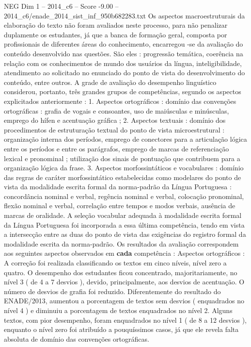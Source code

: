 \begin{textsample}{NEG Dim 1 – 2014\_c6 – Score -9.00 – 2014\_c6/enade\_2014\_sist\_inf\_950b682283.txt}
Os aspectos macroestruturais da elaboração do texto não foram avaliados neste processo, para não penalizar duplamente os estudantes, já que a banca de formação geral, composta por profissionais de diferentes áreas do conhecimento, encarregou -se da avaliação do conteúdo desenvolvido nas questões.
São eles : progressão temática, coerência na relação com os conhecimentos de mundo dos usuários da língua, inteligibilidade, atendimento ao solicitado no enunciado do ponto de vista do desenvolvimento do conteúdo, entre outros.
A grade de avaliação do desempenho linguístico considerou, portanto, três grandes grupos de competências, segundo os aspectos explicitados anteriormente : 1.
Aspectos ortográficos : domínio das convenções ortográficas : grafia de vogais e consoantes, uso de maiúsculas e minúsculas, emprego do hífen e acentuação gráfica ; 2.
Aspectos textuais : domínio dos procedimentos de estruturação textual do ponto de vista microestrutural : organização interna dos períodos, emprego de conectores para a articulação lógica entre os períodos e entre os parágrafos, emprego de marcas de referenciação lexical e pronominal ; utilização dos sinais de pontuação que contribuem para a organização lógica da frase. 3.
Aspectos morfossintáticos e vocabulares : domínio das regras de caráter morfossintático estabelecidas como modelares do ponto de vista da modalidade escrita formal da norma-padrão da Língua Portuguesa : concordância nominal e verbal, regência nominal e verbal, colocação pronominal, flexão nominal e verbal, correlação entre tempos e modos verbais, ausência de marcas de oralidade.
A seleção vocabular adequada à modalidade escrita formal da Língua Portuguesa foi incorporada a essa última competência, tendo em vista a intersecção entre as duas do ponto de vista das exigências do registro formal da modalidade escrita da norma-padrão.
Os resultados da avaliação correspondem aos seguintes aspectos observados em \textbf{cada} competência : Aspectos ortográficos : A correção foi realizada classificando os textos em cinco níveis, nível zero a quatro.
O desempenho dos estudantes ficou concentrado, majoritariamente, no nível 3 ( de 4 a 7 desvios ), devido, principalmente, aos desvios de acentuação.
O número de desvios de grafia foi reduzido.
Diferentemente do resultado do ENADE/2013, aumentou a porcentagem de textos sem desvios ( enquadrados no nível 4 ) e diminuiu a porcentagem de textos enquadrados no nível 2.
Alguns textos, com pior desempenho, foram enquadrados no nível 1 ( de 8 a 12 desvios ), enquanto o nível zero foi atribuído a pouquíssimos casos, já que ele revela falta absoluta de domínio das convenções ortográficas.

\end{textsample}
